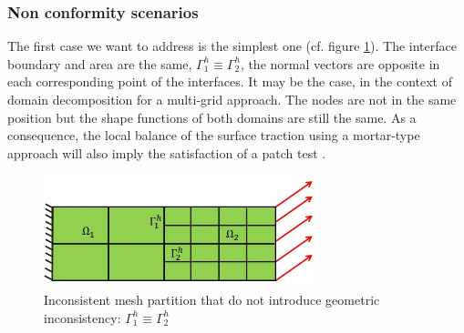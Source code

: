  \subsubsection{Non conformity scenarios}\label{sssec321}
 The first case we want to address is the simplest one (cf. figure \ref{fig.4}). The interface boundary and area are the same, $\Gamma_1^{h} \equiv \Gamma_2^{h} $, the normal vectors are opposite in each corresponding point of the interfaces. It may be the case, in the context of domain decomposition for a multi-grid approach. The nodes are not in the same position but the shape functions of both domains are still the same. As a consequence, the local balance of the surface traction using a mortar-type approach will also imply the satisfaction of a patch test \cite{park2002simpl}.
 \\
 \begin{figure}[ht]
 \centering
 \includegraphics[width=8cm]{images/Ch1/Mesh_inconsist_1}
 \caption{Inconsistent mesh partition that do not introduce geometric inconsistency: $\Gamma_1^{h} \equiv \Gamma_2^{h} $}  
 \label{fig.4}
 \end{figure}
 
